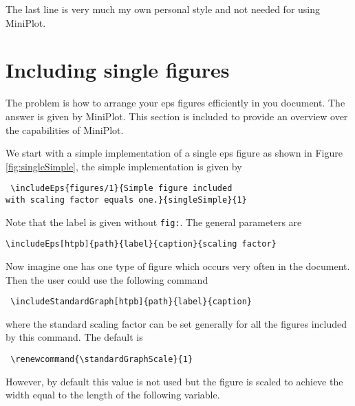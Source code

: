 \documentclass[12pt,a4paper]{article}
\newcommand{\comm}[1]{\texttt{#1}}
\begin{document}
The last line is very much my own personal style and not needed for using 
MiniPlot.



\section{Including single figures}

The problem is how to arrange your eps figures efficiently in you
document. The answer is given by MiniPlot. This section is
included to provide an overview over the capabilities of MiniPlot.

We start with a simple implementation of a single eps figure as
shown in Figure \ref{fig:singleSimple}, the simple implementation
is given by

\begin{verbatim} \includeEps{figures/1}{Simple figure included 
with scaling factor equals one.}{singleSimple}{1} \end{verbatim}


Note that the label is given without \comm{fig:}. The general 
parameters are

\begin{verbatim}
\includeEps[htpb]{path}{label}{caption}{scaling factor}
\end{verbatim}

Now imagine one has one type of figure which occurs very often in 
the document. Then the user could use the following command

\begin{verbatim} \includeStandardGraph[htpb]{path}{label}{caption} 
\end{verbatim}

where the standard scaling factor can be set generally for all 
the figures included by this command. The default is 

\begin{verbatim} \renewcommand{\standardGraphScale}{1} 
\end{verbatim}


However, by default this value is not used but the figure is 
scaled to achieve the width equal to the length of the following 
variable.
\end{document}
